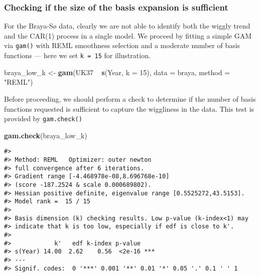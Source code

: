 \documentclass[12pt,]{article}
\newenvironment{Shaded}{\begin{snugshade}}{\end{snugshade}}
\newcommand{\KeywordTok}[1]{\textcolor[rgb]{0.13,0.29,0.53}{\textbf{{#1}}}}
\newcommand{\DataTypeTok}[1]{\textcolor[rgb]{0.13,0.29,0.53}{{#1}}}
\newcommand{\DecValTok}[1]{\textcolor[rgb]{0.00,0.00,0.81}{{#1}}}
\newcommand{\StringTok}[1]{\textcolor[rgb]{0.31,0.60,0.02}{{#1}}}
\newcommand{\NormalTok}[1]{{#1}}
\begin{document}
\subsubsection{Checking if the size of the basis expansion is
sufficient}\label{checking-if-the-size-of-the-basis-expansion-is-sufficient}

For the Braya-Sø data, clearly we are not able to identify both the
wiggly trend and the CAR(1) process in a single model. We proceed by
fitting a simple GAM via \texttt{gam()} with REML smoothness selection
and a moderate number of basis functions --- here we set
\texttt{k\ =\ 15} for illustration.

\begin{Shaded}
\begin{Highlighting}[]
\NormalTok{braya_low_k <-}\StringTok{ }\KeywordTok{gam}\NormalTok{(UK37 ~}\StringTok{ }\KeywordTok{s}\NormalTok{(Year, }\DataTypeTok{k =} \DecValTok{15}\NormalTok{), }\DataTypeTok{data =} \NormalTok{braya, }\DataTypeTok{method =} \StringTok{"REML"}\NormalTok{)}
\end{Highlighting}
\end{Shaded}

Before proceeding, we should perform a check to determine if the number
of basis functions requested is sufficient to capture the wiggliness in
the data. This test is provided by \texttt{gam.check()}

\begin{Shaded}
\begin{Highlighting}[]
\KeywordTok{gam.check}\NormalTok{(braya_low_k)}
\end{Highlighting}
\end{Shaded}

\begin{verbatim}
#> 
#> Method: REML   Optimizer: outer newton
#> full convergence after 6 iterations.
#> Gradient range [-4.468978e-08,8.696768e-10]
#> (score -187.2524 & scale 0.000689802).
#> Hessian positive definite, eigenvalue range [0.5525272,43.5153].
#> Model rank =  15 / 15 
#> 
#> Basis dimension (k) checking results. Low p-value (k-index<1) may
#> indicate that k is too low, especially if edf is close to k'.
#> 
#>            k'   edf k-index p-value    
#> s(Year) 14.00  2.62    0.56  <2e-16 ***
#> ---
#> Signif. codes:  0 '***' 0.001 '**' 0.01 '*' 0.05 '.' 0.1 ' ' 1
\end{verbatim}
\end{document}
